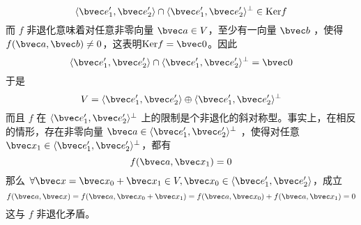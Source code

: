 \begin{equation}
\langle\bvec e'_1,\bvec e'_2\rangle\cap\langle\bvec e'_1,\bvec e'_2\rangle^{\perp}\in \mathrm{Ker} f
\end{equation}
而 $f$ 非退化意味着对任意非零向量 $\bvec a\in V$，至少有一向量 $\bvec b$ ，使得 $f(\bvec a,\bvec b)\neq0$，这表明$\mathrm{Ker} f=\bvec 0$。因此
\begin{equation}
\langle\bvec e'_1,\bvec e'_2\rangle\cap\langle\bvec e'_1,\bvec e'_2\rangle^{\perp}=\bvec 0
\end{equation}
于是
\begin{equation}
V=\langle\bvec e'_1,\bvec e'_2\rangle\oplus\langle\bvec e'_1,\bvec e'_2\rangle^{\perp}
\end{equation}
而且 $f$ 在 $\langle\bvec e'_1,\bvec e'_2\rangle^{\perp}$ 上的限制是个非退化的斜对称型。事实上，在相反的情形，存在非零向量 $\bvec a\in \langle\bvec e'_1,\bvec e'_2\rangle^{\perp}$ ，使得对任意 $\bvec x_1\in\langle\bvec e'_1,\bvec e'_2\rangle^{\perp}$，都有
\begin{equation}
f(\bvec a,\bvec x_1)=0
\end{equation}
那么 $\forall \bvec x=\bvec x_0+\bvec x_1\in V,\bvec x_0\in\langle\bvec e'_1,\bvec e'_2\rangle$，成立
\begin{equation}
f(\bvec a,\bvec x)=f(\bvec a,\bvec x_0+\bvec x_1)=f(\bvec a,\bvec x_0)+f(\bvec a,\bvec x_1)=0
\end{equation}
这与 $f$ 非退化矛盾。

